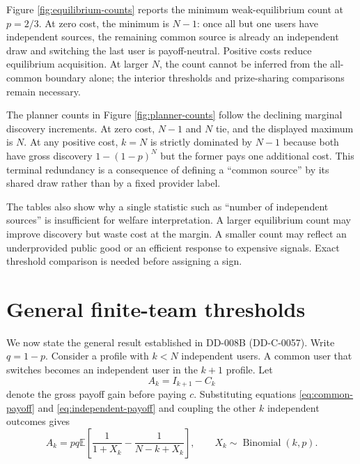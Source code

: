 \documentclass[11pt]{article}
\newcommand{\E}{\mathbb{E}}
\begin{document}


Figure \ref{fig:equilibrium-counts} reports the minimum weak-equilibrium count
at $p=2/3$. At zero cost, the minimum is $N-1$: once all but one users have
independent sources, the remaining common source is already an independent draw
and switching the last user is payoff-neutral. Positive costs reduce equilibrium
acquisition. At larger $N$, the count cannot be inferred from the all-common
boundary alone; the interior thresholds and prize-sharing comparisons remain
necessary.



The planner counts in Figure \ref{fig:planner-counts} follow the declining
marginal discovery increments. At zero cost, $N-1$ and $N$ tie, and the displayed
maximum is $N$. At any positive cost, $k=N$ is strictly dominated by $N-1$
because both have gross discovery $1-(1-p)^N$ but the former pays one additional
cost. This terminal redundancy is a consequence of defining a ``common source''
by its shared draw rather than by a fixed provider label.

The tables also show why a single statistic such as ``number of independent
sources'' is insufficient for welfare interpretation. A larger equilibrium
count may improve discovery but waste cost at the margin. A smaller count may
reflect an underprovided public good or an efficient response to expensive
signals. Exact threshold comparison is needed before assigning a sign.

\section{General finite-team thresholds}

We now state the general result established in DD-008B (DD-C-0057). Write
$q=1-p$. Consider a profile with $k<N$ independent users. A common user that
switches becomes an independent user in the $k+1$ profile. Let
\begin{equation}
 A_k=I_{k+1}-C_k
 \label{eq:ak-definition}
\end{equation}
denote the gross payoff gain before paying $c$. Substituting equations
\eqref{eq:common-payoff} and \eqref{eq:independent-payoff} and coupling the
other $k$ independent outcomes gives
\begin{equation}
A_k=pq\E\left[\frac{1}{1+X_k}-\frac{1}{N-k+X_k}\right],
\qquad X_k\sim\operatorname{Binomial}(k,p).
\label{eq:ak}
\end{equation}
\end{document}
